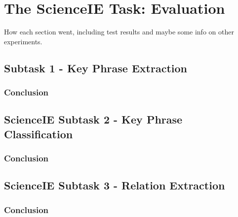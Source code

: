 \section{The ScienceIE Task: Evaluation}

How each section went, including test results and maybe some info on other experiments.

\subsection{Subtask 1 - Key Phrase Extraction}

\subsubsection{Conclusion}

\subsection{ScienceIE Subtask 2 - Key Phrase Classification}

\subsubsection{Conclusion}

\subsection{ScienceIE Subtask 3 - Relation Extraction}

\subsubsection{Conclusion}
